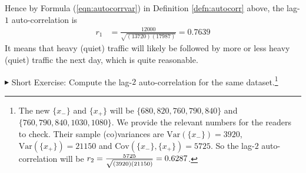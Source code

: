 Hence by Formula (\ref{eqn:autocorrvar}) in Definition \ref{defn:autocorr} above, the lag-$1$ auto-correlation is
\begin{align*}
r_1 &= \frac{12000}{\sqrt{(13720)(17987)}} = 0.7639
\end{align*}
It means that heavy (quiet) traffic will likely be followed by more or less heavy (quiet) traffic the next day, which is quite reasonable.\par
$\blacktriangleright$ Short Exercise: Compute the lag-$2$ auto-correlation for the same dataset.\footnote{The new $\{x_-\}$ and $\{x_+\}$ will be $\{680, 820, 760, 790, 840\}$ and $\{760, 790, 840, 1030, 1080\}$. We provide the relevant numbers for the readers to check. Their sample (co)variances are $\text{Var}(\{x_-\}) = 3920$, $\text{Var}(\{x_+\}) = 21150$ and $\text{Cov}(\{x_{-}\},\{x_{+}\}) = 5725$. So the lag-$2$ auto-correlation will be $r_2 = \smash{\frac{5725}{\sqrt{(3920)(21150)}}} = 0.6287$.}


